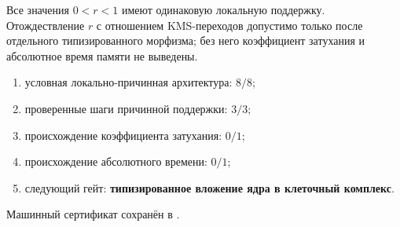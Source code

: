 \begin{nogocriterion}
Все значения $0<r<1$ имеют одинаковую локальную поддержку. Отождествление
$r$ с отношением KMS-переходов допустимо только после отдельного
типизированного морфизма; без него коэффициент затухания и абсолютное время
памяти не выведены.
\end{nogocriterion}

\begin{protocol}\begin{enumerate}
\item условная локально-причинная архитектура: \textbf{$8/8$};
\item проверенные шаги причинной поддержки: \textbf{$3/3$};
\item происхождение коэффициента затухания: \textbf{$0/1$};
\item происхождение абсолютного времени: \textbf{$0/1$};
\item следующий гейт: \textbf{типизированное вложение ядра в клеточный комплекс}.
\end{enumerate}\end{protocol}

Машинный сертификат сохранён в
.